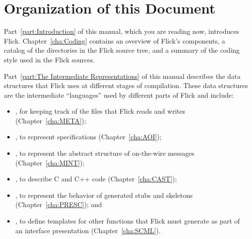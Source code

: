 

\section{Organization of this Document}
\label{sec:Intro:Organization of this Document}

Part~\ref{part:Introduction} of this manual, which you are reading now,
introduces Flick.  Chapter~\ref{cha:Coding} contains an overview of Flick's
components, a catalog of the directories in the Flick source tree, and a
summary of the coding style used in the Flick sources.

Part~\ref{part:The Intermediate Representations} of this manual describes the
data structures that Flick uses at different stages of \IDL{} compilation.
These data structures are the intermediate ``languages'' used by different
parts of Flick and include:

\begin{itemize}
  \item \META{}, for keeping track of the files that Flick reads and writes
  (Chapter~\ref{cha:META});

  \item \AOI{}, to represent \IDL{} specifications (Chapter~\ref{cha:AOI});

  \item \MINT{}, to represent the abstract structure of on-the-wire messages
  (Chapter~\ref{cha:MINT});

  \item \CAST{}, to describe C and C++ code (Chapter~\ref{cha:CAST});

  \item \PRESC{}, to represent the behavior of generated stubs and skeletons
  (Chapter~\ref{cha:PRESC}); and

  \item \SCML{}, to define templates for other functions that Flick must
  generate as part of an interface presentation (Chapter~\ref{cha:SCML}).
\end{itemize}

